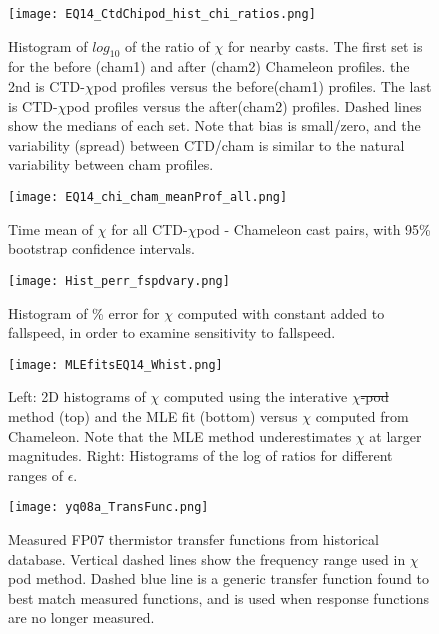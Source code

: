 \documentclass{ametsoc}
\providecommand{\DIFadd}[1]{{\protect\color{blue}\uwave{#1}}} %
\providecommand{\DIFdel}[1]{{\protect\color{red}\sout{#1}}}                      %
\providecommand{\DIFaddFL}[1]{\DIFadd{#1}} %
\providecommand{\DIFdelFL}[1]{\DIFdel{#1}} %
\providecommand{\DIFaddbeginFL}{} %
\providecommand{\DIFaddendFL}{} %
\providecommand{\DIFdelbeginFL}{} %
\providecommand{\DIFdelendFL}{} %
\begin{document}
\begin{figure}[t]
  \noindent\texttt{[image: EQ14\_CtdChipod\_hist\_chi\_ratios.png]}\\
  \caption{Histogram of $log_{10}$ of the ratio of $\chi$ for nearby casts. The first set is for the before (cham1) and after (cham2) Chameleon profiles. the 2nd is CTD-$\chi$pod profiles versus the before(cham1) profiles. The last is CTD-$\chi$pod profiles versus the after(cham2) profiles. Dashed lines show the medians of each set.  Note that bias is small/zero, and the variability (spread) between CTD/cham is similar to the natural variability between cham profiles.}
  \label{eq14_cdtChi_vs_cham_hist}
\end{figure}

\begin{figure}[t]
  \noindent\texttt{[image: EQ14\_chi\_cham\_meanProf\_all.png]}\\
  \caption{Time mean of $\chi$ for all CTD-$\chi$pod - Chameleon cast pairs, with 95\% bootstrap confidence intervals.}
  \label{ctd_cham_chi_boot_all}
\end{figure}


\begin{figure}[t]
  \noindent\texttt{[image: Hist\_perr\_fspdvary.png]}\\
  \caption{Histogram of \% error for $\chi$ computed with constant added to fallspeed, in order to examine sensitivity to fallspeed.}
  \label{FspdSensHist}
\end{figure}


\begin{figure}[t]
  \noindent\texttt{[image: MLEfitsEQ14\_Whist.png]}\\
  \caption{Left: 2D histograms of $\chi$ computed using the interative $\chi$\DIFdelbeginFL \DIFdelFL{-pod }\DIFdelendFL \DIFaddbeginFL \DIFaddFL{pod }\DIFaddendFL method (top) and the MLE fit (bottom) versus $\chi$ computed from Chameleon. Note that the MLE method underestimates $\chi$ at larger magnitudes. Right: Histograms of the log of ratios for different ranges of $\epsilon$.}
  \label{mlefits}
\end{figure}


\begin{figure}[t]
  \noindent\texttt{[image: yq08a\_TransFunc.png]}\\
  \caption{Measured FP07 thermistor transfer functions from historical database. Vertical dashed lines show the frequency range used in $\chi$pod method. Dashed blue line is a generic transfer function found to best match measured functions, and is used when response functions are no longer measured.}
  \label{xfr}
\end{figure}
\end{document}
